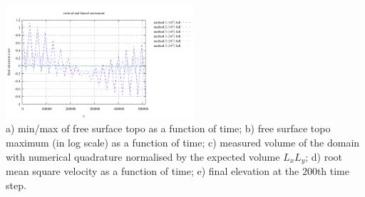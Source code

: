 \begin{center}
\includegraphics[width=7cm]{python_codes/fieldstone_54/images/surface_topography_200_full.pdf}\\
{\scriptsize 
a) min/max of free surface topo as a function of time; 
b) free surface topo maximum (in log scale) as a function of time; 
c) measured volume of the domain with numerical quadrature normalised by the expected volume $L_xL_y$;
d) root mean square velocity as a function of time;
e) final elevation at the 200th time step.}
\end{center}
